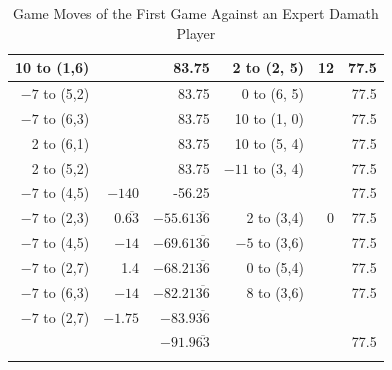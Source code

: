 \begin{appendices}
\begin{longtable}[H]{rrrrrr}
     10 to (1,6) &      &  83.75    &   2 to (2, 5) &  12    &  77.5    \\ \hline
     $-7$ to (5,2) &      &  83.75    &   0 to (6, 5) &      &  77.5    \\ \hline
     $-7$ to (6,3) &      &  83.75    &  10 to (1, 0) &      &  77.5    \\ \hline
      2 to (6,1) &      &  83.75    &  10 to (5, 4) &      &  77.5    \\ \hline
      2 to (5,2) &      &  83.75    & $-11$ to (3, 4) &      &  77.5    \\ \hline
    $-7$ to (4,5) &  $-140$  &  -56.25  &                &      &  77.5    \\ \hline
    $-7$ to (2,3) &  $0.\overline{63}$   &  $-55.61\overline{36}$   &   2 to (3,4)  &  0    &  77.5    \\ \hline
    $-7$ to (4,5) &  $-14$    &   $-69.61\overline{36}$&  $-5$ to (3,6)  &      &  77.5    \\ \hline
    $-7$ to (2,7) &  1.4    &  $-68.21\overline{36}$   &   0 to (5,4)  &      &  77.5    \\ \hline
    $-7$ to (6,3) &  $-14$    & $-82.21\overline{36}$     &   8 to (3,6)  &      &  77.5    \\ \hline
    $-7$ to (2,7) &  $-1.75$    &  $-83.9\overline{36}$   &               &      &      \\ \hline\hline 
                 &           &  $-91.9\overline{63}$   &               &      & 77.5  \\ \hline 
    \caption{Game Moves of the First Game Against an Expert Damath Player}
    \label{tab:first-game}
\end{longtable}
\endgroup


\end{appendices}
